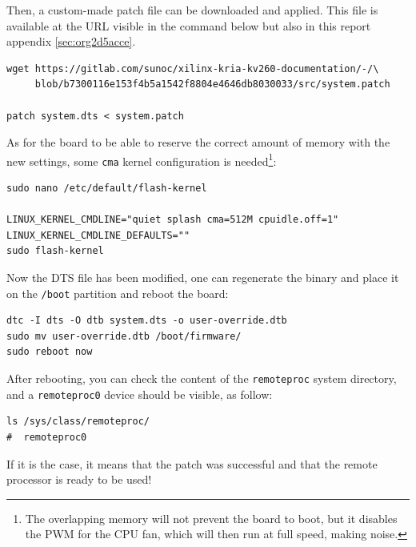 \documentclass[10pt]{article}
\begin{document}
Then, a custom-made patch file can be downloaded and applied.
This file is available at the URL visible in the command below
but also in this report appendix \ref{sec:org2d5acce}.

\begin{verbatim}
wget https://gitlab.com/sunoc/xilinx-kria-kv260-documentation/-/\
     blob/b7300116e153f4b5a1542f8804e4646db8030033/src/system.patch

patch system.dts < system.patch
\end{verbatim}

As for the board to be able to reserve the correct amount of memory with the new settings, some
\texttt{cma} kernel configuration is needed\footnote{The overlapping memory will not prevent the board to boot,
but it disables the PWM for the CPU fan, which will then run at full speed, making noise.}:

\begin{verbatim}
sudo nano /etc/default/flash-kernel

LINUX_KERNEL_CMDLINE="quiet splash cma=512M cpuidle.off=1"
LINUX_KERNEL_CMDLINE_DEFAULTS=""
sudo flash-kernel
\end{verbatim}

Now the DTS file has been modified, one can regenerate the binary and place it on the \texttt{/boot} partition
and reboot the board:

\begin{verbatim}
dtc -I dts -O dtb system.dts -o user-override.dtb
sudo mv user-override.dtb /boot/firmware/
sudo reboot now
\end{verbatim}

After rebooting, you can check the content of the \verb|remoteproc| system directory,
and a \texttt{remoteproc0} device should be visible, as follow:

\begin{verbatim}
ls /sys/class/remoteproc/
#  remoteproc0
\end{verbatim}

If it is the case, it means that the patch was successful and  that the remote processor is
ready to be used!
\pagebreak
\end{document}
